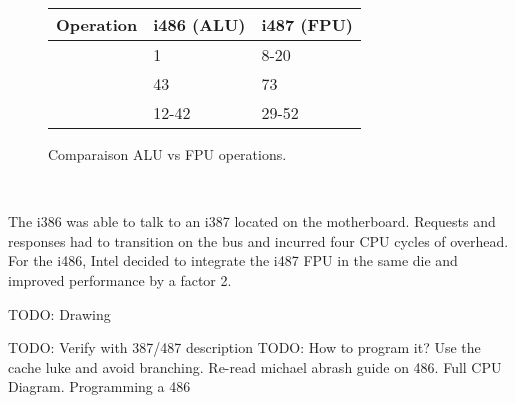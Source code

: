 \par
 \begin{figure}[H]
\centering  
\begin{tabularx}{\textwidth}{ L{0.3} L{0.3} L{0.4}}
  \toprule
  \textbf{Operation} &  \textbf{i486 (ALU)} & \textbf{i487 (FPU)} \\
  \toprule 
   
    & 1 & 8-20\\
    & 43 & 73\\
    & 12-42 & 29-52\\
   \toprule
\end{tabularx}
\caption{Comparaison ALU vs FPU operations.}
\end{figure}
\par
{}\\
 \par


The i386 was able to talk to an i387 located on the motherboard. Requests and responses had to transition on the bus and incurred four CPU cycles of overhead. For the i486, Intel decided to integrate the i487 FPU in the same die and improved performance by a factor 2.\\
\par
TODO: Drawing
\par

TODO: Verify with 387/487 description
TODO: How to program it? Use the cache luke and avoid branching. Re-read michael abrash guide on 486.
Full CPU Diagram.
Programming a 486